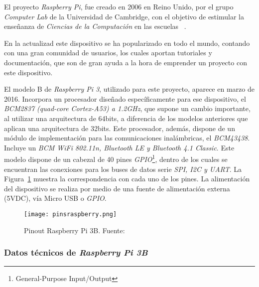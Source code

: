 El proyecto \emph{Raspberry Pi}, fue creado en 2006 en Reino Unido, por el grupo \emph{Computer Lab} de la Universidad de Cambridge, con el objetivo de estimular la enseñanza de \emph{Ciencias de la Computación} en las escuelas ~\cite{Upton}.

En la actualizad este dispositivo se ha popularizado en todo el mundo, contando con una gran comunidad de usuarios, los cuales aportan tutoriales y documentación, que son de gran ayuda a la hora de emprender un proyecto con este dispositivo. 

El modelo B de \emph{Raspberry Pi 3}, utilizado para este proyecto, aparece en marzo de 2016. Incorpora un procesador diseñado específicamente para ese dispositivo, el \emph{BCM2837 (quad-core Cortex-A53) a 1.2GHz}, que supone un cambio importante, al utilizar una arquitectura de 64bits, a diferencia de los modelos anteriores que aplican una arquitectura de 32bits. Este procesador, además, dispone de un módulo de implementación para las comunicaciones inalámbricas, el \emph{BCM43438}. Incluye un \emph{BCM WiFi 802.11n, Bluetooth LE y Bluetooth 4.1 Classic}.
Este modelo dispone de un cabezal de 40 pines \emph{GPIO}\footnote{General-Purpose Input/Output}, dentro de los cuales se encuentran las conexiones para los buses de datos serie \emph{SPI, I2C y UART}. La Figura~\ref{fig:pinsraspberry} muestra la correspondencia con cada uno de los pines.
La alimentación del dispositivo se realiza por medio de una fuente de alimentación externa (5VDC), vía Micro USB o \emph{GPIO}.

\begin{figure}[!h]
\begin{center}
\texttt{[image: pinsraspberry.png]}
\caption{Pinout Raspberry Pi 3B. Fuente: ~\cite{Upton}}
\label{fig:pinsraspberry}
\end{center}
\end{figure}

\subsubsection{Datos técnicos de \emph{Raspberry Pi 3B}}

